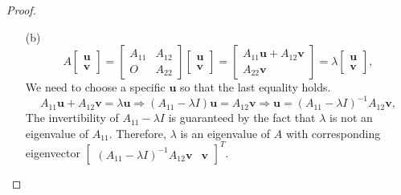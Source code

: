\begin{proof}
\begin{itemize}
  \item[(b)]
    \begin{displaymath}
      A
      \begin{bmatrix}
        \mathbf{u} \\
        \mathbf{v}
      \end{bmatrix}
      =
      \begin{bmatrix}
        A_{11} & A_{12} \\
        O & A_{22}
      \end{bmatrix}
      \begin{bmatrix}
        \mathbf{u}  \\
        \mathbf{v}
      \end{bmatrix}
      =
      \begin{bmatrix}
        A_{11}\mathbf{u} + A_{12}\mathbf{v} \\
        A_{22}\mathbf{v}
      \end{bmatrix}
      =\lambda
      \begin{bmatrix}
        \mathbf{u} \\
        \mathbf{v}
      \end{bmatrix},
    \end{displaymath}
    We need to choose a specific $\mathbf{u}$
    so that the last equality holds.
    \begin{displaymath}
      A_{11}\mathbf{u} + A_{12}\mathbf{v} = \lambda\mathbf{u} \Rightarrow (A_{11}-\lambda I)\mathbf{u} = A_{12}\mathbf{v}
      \Rightarrow \mathbf{u} = (A_{11}-\lambda I)^{-1}A_{12}\mathbf{v},
    \end{displaymath}
    The invertibility of $A_{11}-\lambda I$ is guaranteed by the fact
    that $\lambda$ is not an eigenvalue of $A_{11}$.
    Therefore, $\lambda$ is an eigenvalue of $A$
    with corresponding eigenvector
    $
    \begin{bmatrix}
      (A_{11}-\lambda I)^{-1}A_{12}\mathbf{v} & \mathbf{v}
    \end{bmatrix}^T
    $.


\end{itemize}
\end{proof}
